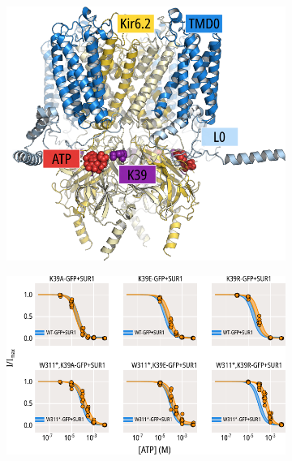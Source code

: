 \begin{figure}[h]
	\centering
	\begin{subfigure}[t]{0.45\textwidth}
		\caption{}\label{ch5fig:k39_loc}
		\centering
		\includegraphics[width=\textwidth]{k39_1.pdf}
	\end{subfigure}
	\hfill
	\begin{subfigure}[t]{0.45\textwidth}
		\caption{}\label{ch5fig:k39_atp_popfits}
		\centering
		\includegraphics[width=\textwidth]{k39_2.pdf}
	\end{subfigure}
	\vfill
	\begin{subfigure}[t]{0.45\textwidth}
		\caption{}\label{ch5fig:k39_tnpatp_popfits_1}

\end{subfigure}
\end{figure}

